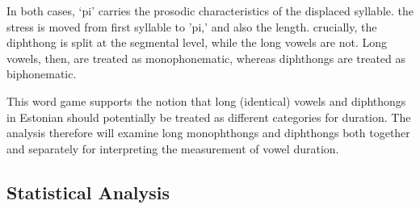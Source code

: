 In both cases, `pi' carries the prosodic characteristics of the displaced syllable. the stress is moved from first syllable to 'pi,' and also the length. crucially, the diphthong is split at the segmental level, while the long vowels are not.  Long vowels, then, are treated as monophonematic, whereas diphthongs are treated as biphonematic. 

This word game supports the notion that long (identical) vowels and diphthongs in  Estonian should potentially be treated as different categories for duration. The analysis therefore will examine long monophthongs and diphthongs both together and separately for interpreting  the measurement of vowel duration. 

\cite{lehiste1985}

\subsection{Statistical Analysis} 
%
%
%
%
%
